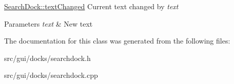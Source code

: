 \hyperlink{classGui_1_1Docks_1_1SearchDock_a9b33dea8adfe26b4d7a5dadffbbb07a7}{Search\+Dock\+::text\+Changed} Current text changed by {\itshape text} 


\begin{DoxyParams}{Parameters}
{\em text} & New text \\
\hline
\end{DoxyParams}


The documentation for this class was generated from the following files\+:\begin{DoxyCompactItemize}
\item 
src/gui/docks/searchdock.\+h\item 
src/gui/docks/searchdock.\+cpp\end{DoxyCompactItemize}
